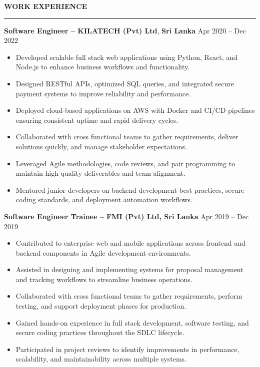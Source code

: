 \documentclass[10pt,letterpaper]{article}
\begin{document}
\vspace{8pt}

\textbf{WORK EXPERIENCE}\\[-8pt]
\noindent\rule{\textwidth}{1pt}

\vspace{-2pt}

\textbf{Software Engineer -- KILATECH (Pvt) Ltd}, \textbf{Sri Lanka} \hfill Apr 2020 -- Dec 2022

\vspace{-1pt}

\begin{itemize}
\item Developed scalable full stack web applications using Python, React, and Node.js to enhance business workflows and functionality.
\item Designed RESTful APIs, optimized SQL queries, and integrated secure payment systems to improve reliability and performance.
\item Deployed cloud-based applications on AWS with Docker and CI/CD pipelines ensuring consistent uptime and rapid delivery cycles.
\item Collaborated with cross functional teams to gather requirements, deliver solutions quickly, and manage stakeholder expectations.
\item Leveraged Agile methodologies, code reviews, and pair programming to maintain high-quality deliverables and team alignment.
\item Mentored junior developers on backend development best practices, secure coding standards, and deployment automation workflows.
\end{itemize}

\textbf{Software Engineer Trainee -- FMI (Pvt) Ltd, Sri Lanka} \hfill Apr 2019 -- Dec 2019

\vspace{-1pt}

\begin{itemize}
\item Contributed to enterprise web and mobile applications across frontend and backend components in Agile development environments.
\item Assisted in designing and implementing systems for proposal management and tracking workflows to streamline business operations.
\item Collaborated with cross functional teams to gather requirements, perform testing, and support deployment phases for production.
\item Gained hands-on experience in full stack development, software testing, and secure coding practices throughout the SDLC lifecycle.
\item Participated in project reviews to identify improvements in performance, scalability, and maintainability across multiple systems.
\end{itemize}
\end{document}
